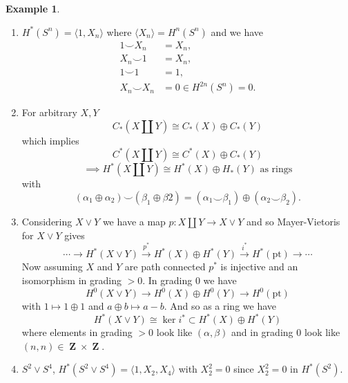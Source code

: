 \documentclass[10pt,]{book}
\newcommand{\gt}{>}
\theoremstyle{plain}
\theoremstyle{definition}
\newtheorem{example}[theorem]{Example}
\numberwithin{equation}{section}
\DeclareMathOperator{\ZZ}{\mathbf{Z}}
\begin{document}
\begin{example}\label{example-26}
\begin{enumerate}
\item{}\(H^*(S^n) = \langle 1, X_n\rangle\) where \(\langle X_n\rangle = H^n(S^n)\) and we have
                  \begin{align*}
1\smile X_n &= X_n,\\
X_n\smile 1 &= X_n,\\
1\smile 1 &= 1,\\
X_n\smile X_n &= 0 \in H^{2n}(S^n) = 0.
\end{align*}
                \item{}For arbitrary \(X,Y\)
                  \[C_*(X\amalg Y) \cong C_*(X) \oplus C_*(Y)\]
                  which implies
                  \[C^*(X\amalg Y) \cong C^*(X) \oplus C_*(Y)\]
                  \[\implies H^*(X\amalg Y) \cong H^*(X) \oplus H_*(Y)\text{ as rings}\]
                  with
                  \[ (\alpha_1 \oplus \alpha_2) \smile (\beta_1 \oplus \beta2) = (\alpha_1 \smile \beta_1)\oplus (\alpha_2 \smile \beta_2).\]
                \item{}Considering \(X\vee Y\) we have a map \(p\colon X\amalg Y \to X \vee Y\) and so Mayer-Vietoris for \(X \vee Y\) gives
                  \[ \cdots \to H^*(X\vee Y) \xrightarrow{p^*} H^*(X)\oplus H^*(Y) \xrightarrow{i^*} H^*(\text{pt}) \to \cdots\]
                  Now assuming \(X\) and \(Y\) are path connected \(p^*\) is injective and an isomorphism in grading \(\gt 0\).
                  In grading 0 we have
                  \[H^0(X \vee Y) \to H^0(X) \oplus H^0(Y) \to H^0(\text{pt})\]
                  with \(1 \mapsto 1\oplus 1\) and \(a\oplus b \mapsto a-b\).
                  And so as a ring we have
                  \[ H^*(X\vee Y) \cong \ker i^* \subset H^*(X)\oplus H^*(Y)\]
                  where elements in grading \(\gt 0\) look like \((\alpha,\beta)\) and in grading 0 look like \((n,n)\in \ZZ \times \ZZ\).
                \item{}\(S^2 \vee S^4\), \(H^*(S^2\vee S^4) = \langle 1, X_2, X_4\rangle\) with \(X_2^2 = 0\) since \(X_2^2 = 0\) in \(H^*(S^2)\).\end{enumerate}
\end{example}
\typeout{************************************************}
\typeout{************************************************}
\end{document}
